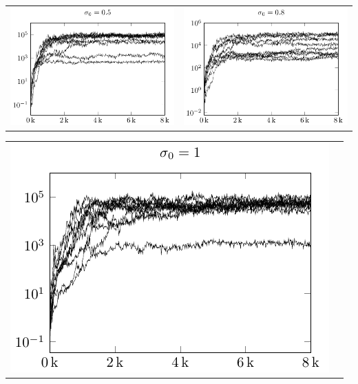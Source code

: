 \begin{tabular}{@{}l@{}l@{}}
\includegraphics[scale=1]{plots/cma_initial_sigma_0_5} &
\includegraphics[scale=1]{plots/cma_initial_sigma_0_8}
\end{tabular}

\begin{tabular}{@{}l@{}l@{}}
\includegraphics[scale=1]{plots/cma_initial_sigma_1_0} &
\end{tabular}

